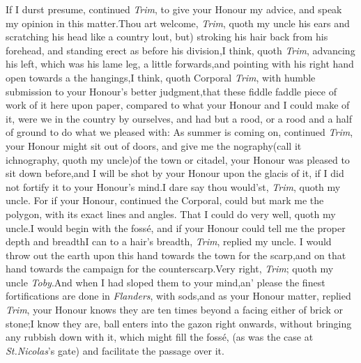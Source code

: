 \documentclass{article}
\begin{document}
If I durst presume, continued \textit{Trim}, 
to give your Honour my advice, and\break
speak my opinion in this matter.\tsk Thou\break
art welcome, \textit{Trim}, quoth my uncle\break
{}
his ears and scratching his head like a
country lout, but) stroking his hair back from his forehead, and
standing erect as before his division,\tsh I think, quoth
\textit{Trim}, advancing his left, which was his lame leg, a little
forwards,\tsk and pointing with his right hand open towards
a\break
{}
the
hangings,\tsh I think, quoth Corporal \textit{Trim}, with
humble submission to your Honour’s better
judgment,\tsh that these
fiddle faddle piece of work of it here\break
upon paper, compared to what your Honour and I
could make of it, were we in the country by ourselves, and had but a
rood, or a rood and a half of ground to do what we pleased with: As
summer is coming on, continued \textit{Trim}, your Honour might sit out
of doors, and give me\break
the nography\tsh (call it ichnography,
quoth my uncle)\tsk of the town or cita\-del, your Honour
was pleased to sit down before,\tsk and I will be shot by your
Honour upon the glacis of it, if I did not fortify it to your
Honour’s mind.\tsh I dare say thou would’st,
\textit{Trim}, quoth my uncle.\break
\tsk For if your Honour, continued the 
Corporal, could but mark me the polygon,
with its exact lines and angles.\tsk\break
That I could do very well, quoth my
uncle.\tsk I would begin with the fossé,\break
and if your Honour
could tell me the proper depth and breadth\tsk I can to a
hair’s breadth, \textit{Trim}, replied my uncle.\tsk\break
I would
throw out the earth upon this hand towards the town for the
scarp,\tsk\break and on that hand towards the campaign for the
counterscarp.\tsk Very right, \textit{Trim}; quoth my uncle
\textit{Toby}.\tsk And when I had sloped them to your
mind,\tsh an’ please 
the finest fortifications are done in \textit{Flan\-ders},
with sods,\tsk and as your Honour
matter, replied \textit{Trim}, your Honour knows
they are ten times beyond a facing either
of brick or stone;\tsh I know they are,
ball enters into the gazon right onwards, 
without bringing any rubbish down with
it, which might fill the fossé, (as was the
case at \textit{St.\@ Nicolas}’s gate) and facilitate\break
the passage over it.
\end{document}
